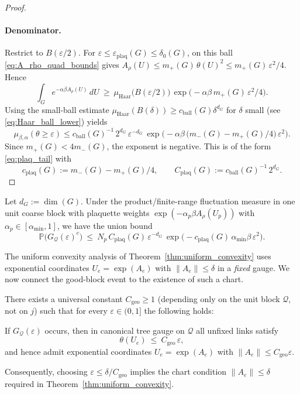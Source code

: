 \begin{proof}
\paragraph{Denominator.}
Restrict to $B(\varepsilon/2)$.
For $\varepsilon\le\varepsilon_{\mathrm{plaq}}(G)\le\delta_0(G)$, on this ball \eqref{eq:A_rho_quad_bounds} gives
$A_\rho(U)\le m_+(G)\,\theta(U)^2\le m_+(G)\,\varepsilon^2/4$. Hence
\[
\int_{G} e^{-\alpha\beta A_\rho(U)}\,dU\ \ge\ \mu_{\mathrm{Haar}}\big(B(\varepsilon/2)\big)\,
\exp\!\big(-\alpha\beta\,m_+(G)\,\varepsilon^2/4\big).
\]
Using the small-ball estimate $\mu_{\mathrm{Haar}}(B(\delta))\ge c_{\mathrm{ball}}(G)\delta^{d_G}$ for $\delta$ small (see \eqref{eq:Haar_ball_lower}) yields
\[
\mu_{\beta,\alpha}(\theta\ge\varepsilon)
\le
c_{\mathrm{ball}}(G)^{-1}\,2^{d_G}\,\varepsilon^{-d_G}\,
\exp\!\Big(-\alpha\beta\,\big(m_-(G)-m_+(G)/4\big)\,\varepsilon^2\Big).
\]
Since $m_+(G)<4m_-(G)$, the exponent is negative. This is of the form \eqref{eq:plaq_tail} with
\[
c_{\mathrm{plaq}}(G):=m_-(G)-m_+(G)/4,\qquad C_{\mathrm{plaq}}(G):=c_{\mathrm{ball}}(G)^{-1}\,2^{d_G}.
\]
\end{proof}

\begin{corollary}\label{cor:block_tail}
Let $d_G:=\dim(G)$. Under the product/finite-range fluctuation measure in one unit coarse block with plaquette weights
$\exp(-\alpha_p\beta A_\rho(U_p))$ with $\alpha_p\in[\alpha_{\min},1]$, we have the union bound
\[
\mathbb P\big(G_{\mathcal Q}(\varepsilon)^c\big)\ \le\ N_p\,C_{\mathrm{plaq}}(G)\,\varepsilon^{-d_G}\,
\exp\!\Big(-c_{\mathrm{plaq}}(G)\,\alpha_{\min}\beta\,\varepsilon^2\Big).
\]
\end{corollary}

The uniform convexity analysis of Theorem~\ref{thm:uniform_convexity} uses exponential coordinates $U_e=\exp(A_e)$ with $\|A_e\|\le \delta$ in a \emph{fixed} gauge.
We now connect the good-block event to the existence of such a chart.

\begin{lemma}\label{lem:geo_chart}
There exists a universal constant $C_{\mathrm{geo}}\ge 1$ (depending only on the unit block $\mathcal Q$, not on $j$)
such that for every $\varepsilon\in(0,1]$ the following holds:

If $G_{\mathcal Q}(\varepsilon)$ occurs, then in canonical tree gauge on $\mathcal Q$ all unfixed links satisfy
\[
\theta(U_e)\ \le\ C_{\mathrm{geo}}\,\varepsilon,
\]
and hence admit exponential coordinates $U_e=\exp(A_e)$ with $\|A_e\|\le C_{\mathrm{geo}}\varepsilon$.

Consequently, choosing $\varepsilon\le \delta/C_{\mathrm{geo}}$ implies the chart condition $\|A_e\|\le \delta$
required in Theorem~\ref{thm:uniform_convexity}. 

\end{lemma}


